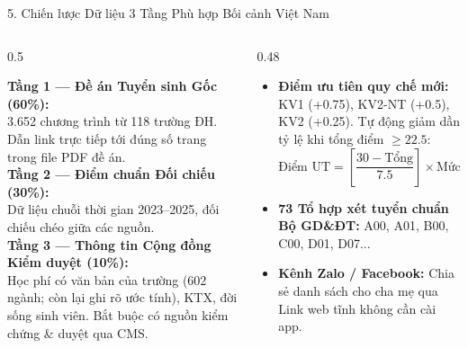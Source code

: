 \documentclass[aspectratio=169, 10pt]{beamer}
\begin{document}
\begin{frame}{5. Chiến lược Dữ liệu 3 Tầng Phù hợp Bối cảnh Việt Nam}
\begin{columns}[T]
  \begin{column}{0.5\textwidth}
    \begin{tcolorbox}[colback=white,colframe=XanhChuDao,title=\textbf{Chiến lược Dữ liệu 3 Tầng Minh bạch}]
      \small
      \textbf{Tầng 1 — Đề án Tuyển sinh Gốc (60\%):}\\
      3.652 chương trình từ 118 trường ĐH. Dẫn link trực tiếp tới đúng số trang trong file PDF đề án.\\
      \textbf{Tầng 2 — Điểm chuẩn Đối chiếu (30\%):}\\
      Dữ liệu chuỗi thời gian 2023–2025, đối chiếu chéo giữa các nguồn.\\
      \textbf{Tầng 3 — Thông tin Cộng đồng Kiểm duyệt (10\%):}\\
      Học phí có văn bản của trường (602 ngành; còn lại ghi rõ ước tính), KTX, đời sống sinh viên. Bắt buộc có nguồn kiểm chứng \& duyệt qua CMS.
    \end{tcolorbox}
  \end{column}
  
  \begin{column}{0.48\textwidth}
    \begin{tcolorbox}[colback=white,colframe=LucThanhCong,title=\textbf{Bản địa hóa Triệt để Cho Người Việt}]
      \small
      \begin{itemize}
        \item \textbf{Điểm ưu tiên quy chế mới:} KV1 (+0.75), KV2-NT (+0.5), KV2 (+0.25). Tự động giảm dần tỷ lệ khi tổng điểm $\ge 22.5$:
        $$\text{Điểm UT} = \left[\frac{30 - \text{Tổng}}{7.5}\right] \times \text{Mức quy định}$$
        \item \textbf{73 Tổ hợp xét tuyển chuẩn Bộ GD\&ĐT:} A00, A01, B00, C00, D01, D07...
        \item \textbf{Kênh Zalo / Facebook:} Chia sẻ danh sách cho cha mẹ qua Link web tĩnh không cần cài app.
      \end{itemize}
    \end{tcolorbox}
  \end{column}
\end{columns}
\end{frame}
\end{document}
